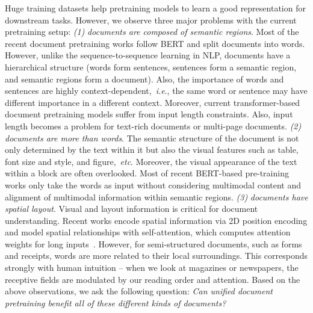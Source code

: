 \documentclass{article}
\def\ie{\emph{i.e}.}
\def\ie{\emph{i.e}.}
\def\etc{\emph{etc}}
\begin{document}
	Huge training datasets help pretraining models to learn a good representation for downstream tasks. However, we observe three major problems with the current pretraining setup: \textit{(1)} \textit{documents are composed of semantic regions}. Most of the recent document pretraining works follow BERT and split documents into words. However, unlike the sequence-to-sequence learning in NLP, documents have a hierarchical structure (words form sentences, sentences form a semantic region, and semantic regions form a document). Also, the importance of words and sentences are highly context-dependent,~\ie, the same word or sentence may have different importance in a different context. Moreover, current transformer-based document pretraining models {suffer} from input length constraints. {Also, input length becomes a problem for text-rich} documents or multi-page documents. \textit{(2)} \textit{documents are more than words}. The semantic structure of the document is not only determined by the text within it but also the visual features such as table, font size and style, and figure,~\etc. Moreover, the visual {appearance} of the text {within} a block {are often overlooked}. {Most of recent} BERT-based pre-{training} works only take the words as input without considering {multimodal content and} alignment of multimodal information {within} semantic regions. \textit{(3)} \textit{documents have spatial layout}. Visual and layout information is critical for document understanding. Recent works encode spatial information via 2D position encoding and model {spatial relationships} with self-attention, which computes attention weights for long {inputs}~\cite{xu2020layoutlm,xu2020layoutlmv2}. However, for semi-structured documents, such as forms and receipts, words are more related to their local surroundings. This corresponds strongly with human intuition -- when we look at magazines or newspapers, the receptive fields are modulated by our reading order and attention. Based on the above observations, {we ask the following} question: \textit{Can unified document pretraining benefit all of these different kinds of documents?}
	
\end{document}
